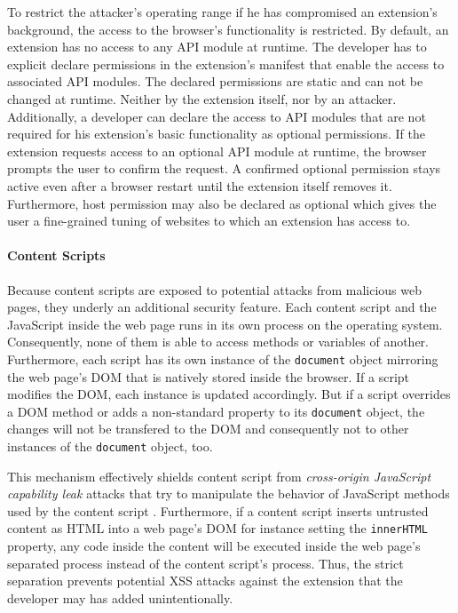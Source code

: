 {	To restrict the attacker's operating range if he has compromised an extension's background, the access to the browser's functionality is restricted. By default, an extension has no access to any API module at runtime. The developer has to explicit declare permissions in the extension's manifest that enable the access to associated API modules. The declared permissions are static and can not be changed at runtime. Neither by the extension itself, nor by an attacker. \\
	Additionally, a developer can declare the access to API modules that are not required for his extension's basic functionality as optional permissions. If the extension requests access to an optional API module at runtime, the browser prompts the user to confirm the request. A confirmed optional permission stays active even after a browser restart until the extension itself removes it. Furthermore, host permission may also be declared as optional which gives the user a fine-grained tuning of websites to which an extension has access to.
	
\paragraph{Content Scripts}

	Because content scripts are exposed to potential attacks from malicious web pages, they underly an additional security feature. Each content script and the JavaScript inside the web page runs in its own process on the operating system. Consequently, none of them is able to access methods or variables of another. Furthermore, each script has its own instance of the \texttt{document} object mirroring the web page's DOM that is natively stored inside the browser. If a script modifies the DOM, each instance is updated accordingly. But if a script overrides a DOM method or adds a non-standard property to its \texttt{document} object, the changes will not be transfered to the DOM and consequently not to other instances of the \texttt{document} object, too.	
	
	This mechanism effectively shields content script from \textit{cross-origin JavaScript capability leak} attacks that try to manipulate the behavior of JavaScript methods used by the content script \cite{Carlini:2012:EGC:2362793.2362800, Barth:2009:CJC:1855768.1855780}. Furthermore, if a content script inserts untrusted content as HTML into a web page's DOM for instance setting the \texttt{innerHTML} property, any code inside the content will be executed inside the web page's separated process instead of the content script's process. Thus, the strict separation prevents potential XSS attacks against the extension that the developer may has added unintentionally.

}
